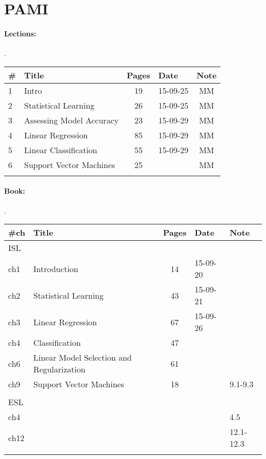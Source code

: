 \documentclass[a4paper,12pt]{article} %
\begin{document}
\newpage
\section{PAMI}
\paragraph{Lections:} .\\
\begin{tabularx}{\textwidth}{|l|X|c|l|c|}
	\hline
	\# & Title & Pages & Date & Note \\
	\hline
	1 & Intro & 19 & 15-09-25 & MM \\
	\hline
	2 & Statistical Learning & 26 & 15-09-25 & MM \\
	\hline
	3 & Assessing Model Accuracy & 23 & 15-09-29 & MM \\
	\hline
	4 & Linear Regression & 85 & 15-09-29 & MM \\
	\hline
	5 & Linear Classification & 55 & 15-09-29 & MM \\
	\hline
	6 & Support Vector Machines & 25 &  & MM \\
	\hline
	&  &  &  &  \\
	\hline
\end{tabularx}

\paragraph{Book:} .\\
\begin{tabularx}{\textwidth}{|l|X|c|l|l|}
	\hline
	\#ch & Title & Pages & Date & Note \\
	\hline
	\multicolumn{5}{|l|}{ISL}\\
	\hline
	ch1 & Introduction & 14 & 15-09-20 &  \\
	\hline
	ch2 & Statistical Learning & 43 & 15-09-21 &  \\
	\hline
	ch3 & Linear Regression & 67 & 15-09-26 &  \\
	\hline
	ch4 & Classification & 47 &  &  \\
	\hline
	ch6 & Linear Model Selection and Regularization & 61 &  &  \\
	\hline
	ch9 & Support Vector Machines & 18 &  & 9.1-9.3 \\
	\hline
	&  &  &  &  \\
	\hline
	\multicolumn{5}{|l|}{ESL}\\
	\hline
	ch4 &  &  &  & 4.5 \\
	\hline
	ch12 &  &  &  & 12.1-12.3 \\
	\hline
	&  &  &  &  \\
	\hline
\end{tabularx}
\end{document}
